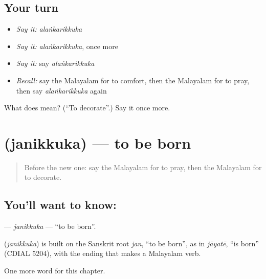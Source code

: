 \subsection*{Your turn}
\begin{itemize}
\raggedright
  \item \emph{Say it:} \emph{alaṅkarikkuka}
  \item \emph{Say it:} \emph{alaṅkarikkuka}, once more
  \item \emph{Say it:} say \emph{alaṅkarikkuka}
  \item \emph{Recall:} say the Malayalam for to comfort, then the Malayalam for to pray, then say \emph{alaṅkarikkuka} again
\end{itemize}

\begin{tcolorbox}[breakable,colback=teal!4,colframe=teal!35!black,title={Before you move on}]
What does  mean? (\textquotedblleft{}To decorate\textquotedblright{}.) Say it once more.
\end{tcolorbox}
\section[\texorpdfstring{\ml{ജനിക്കുക} (janikkuka)}{ജനിക്കുക (janikkuka)}]{ (janikkuka) — to be born}

\label{lesson:ML-C269-janikkuka}



\begin{quote}
Before the new one: say the Malayalam for to pray, then the Malayalam for to decorate.
\end{quote}

\subsection*{You'll want to know: }
\textbf{} — \emph{janikkuka} — \textquotedblleft{}to be born\textquotedblright{}.

\begin{cousinweb}
\textbf{} (\emph{janikkuka}) is built on the Sanskrit root \emph{jan}, \textquotedblleft{}to be born\textquotedblright{}, as in \emph{jāyatē}, \textquotedblleft{}is born\textquotedblright{} (CDIAL 5204), with the ending that makes a Malayalam verb.
\end{cousinweb}

\begin{grammarlens}[title={What you've built}]
One more word for this chapter.
\end{grammarlens}

